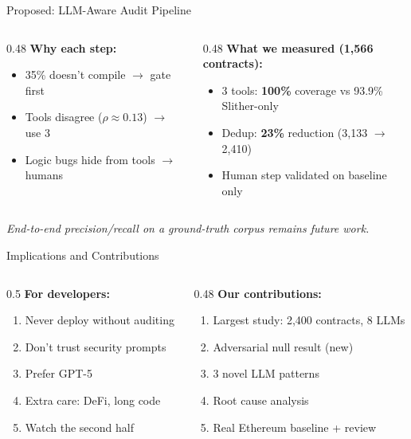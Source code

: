 \documentclass[aspectratio=169]{beamer}
\begin{document}
\begin{frame}{Proposed: LLM-Aware Audit Pipeline}
\vspace{0.15cm}
\begin{columns}
\begin{column}{0.48\textwidth}
\textbf{Why each step:}
\begin{itemize}\small
    \item 35\% doesn't compile $\to$ gate first
    \item Tools disagree ($\rho \approx 0.13$) $\to$ use 3
    \item Logic bugs hide from tools $\to$ humans
\end{itemize}
\end{column}
\begin{column}{0.48\textwidth}
\textbf{What we measured (1,566 contracts):}
\begin{itemize}\small
    \item 3 tools: \textbf{100\%} coverage vs 93.9\% Slither-only
    \item Dedup: \textbf{23\%} reduction (3,133 $\to$ 2,410)
    \item Human step validated on baseline only
\end{itemize}
\end{column}
\end{columns}

\vspace{0.1cm}
{\scriptsize\textit{End-to-end precision/recall on a ground-truth corpus remains future work.}}
\end{frame}

\begin{frame}{Implications and Contributions}
\begin{columns}
\begin{column}{0.5\textwidth}
\textbf{For developers:}
\begin{enumerate}\small
    \item Never deploy without auditing
    \item Don't trust security prompts
    \item Prefer GPT-5
    \item Extra care: DeFi, long code
    \item Watch the second half
\end{enumerate}
\end{column}
\begin{column}{0.48\textwidth}
\textbf{Our contributions:}
\begin{enumerate}\small
    \item Largest study: 2,400 contracts, 8 LLMs
    \item Adversarial null result (new)
    \item 3 novel LLM patterns
    \item Root cause analysis
    \item Real Ethereum baseline + review
\end{enumerate}
\end{column}
\end{columns}
\end{frame}
\end{document}
